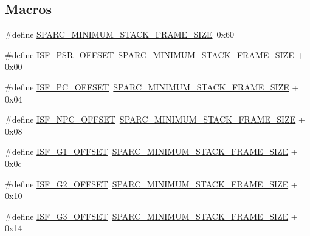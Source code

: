 \subsection*{Macros}
\begin{DoxyCompactItemize}
\item 
\#define \mbox{\hyperlink{group__RTEMSScoreCPUSPARC_ga8e296685f05588131b26bdc695cb9b8c}{S\+P\+A\+R\+C\+\_\+\+M\+I\+N\+I\+M\+U\+M\+\_\+\+S\+T\+A\+C\+K\+\_\+\+F\+R\+A\+M\+E\+\_\+\+S\+I\+ZE}}~0x60
\item 
\#define \mbox{\hyperlink{group__RTEMSScoreCPUSPARC_ga0bee4432eeecb5d6f29d6fbe5048382b}{I\+S\+F\+\_\+\+P\+S\+R\+\_\+\+O\+F\+F\+S\+ET}}~\mbox{\hyperlink{group__RTEMSScoreCPUSPARC_ga8e296685f05588131b26bdc695cb9b8c}{S\+P\+A\+R\+C\+\_\+\+M\+I\+N\+I\+M\+U\+M\+\_\+\+S\+T\+A\+C\+K\+\_\+\+F\+R\+A\+M\+E\+\_\+\+S\+I\+ZE}} + 0x00
\item 
\#define \mbox{\hyperlink{group__RTEMSScoreCPUSPARC_ga9a0a516f04675fb88825c67850a91df5}{I\+S\+F\+\_\+\+P\+C\+\_\+\+O\+F\+F\+S\+ET}}~\mbox{\hyperlink{group__RTEMSScoreCPUSPARC_ga8e296685f05588131b26bdc695cb9b8c}{S\+P\+A\+R\+C\+\_\+\+M\+I\+N\+I\+M\+U\+M\+\_\+\+S\+T\+A\+C\+K\+\_\+\+F\+R\+A\+M\+E\+\_\+\+S\+I\+ZE}} + 0x04
\item 
\#define \mbox{\hyperlink{group__RTEMSScoreCPUSPARC_gaa85e154baea37f924c40a562ceec4017}{I\+S\+F\+\_\+\+N\+P\+C\+\_\+\+O\+F\+F\+S\+ET}}~\mbox{\hyperlink{group__RTEMSScoreCPUSPARC_ga8e296685f05588131b26bdc695cb9b8c}{S\+P\+A\+R\+C\+\_\+\+M\+I\+N\+I\+M\+U\+M\+\_\+\+S\+T\+A\+C\+K\+\_\+\+F\+R\+A\+M\+E\+\_\+\+S\+I\+ZE}} + 0x08
\item 
\#define \mbox{\hyperlink{group__RTEMSScoreCPUSPARC_ga9c08c95ba5cb00d95e8e20edbae0d28a}{I\+S\+F\+\_\+\+G1\+\_\+\+O\+F\+F\+S\+ET}}~\mbox{\hyperlink{group__RTEMSScoreCPUSPARC_ga8e296685f05588131b26bdc695cb9b8c}{S\+P\+A\+R\+C\+\_\+\+M\+I\+N\+I\+M\+U\+M\+\_\+\+S\+T\+A\+C\+K\+\_\+\+F\+R\+A\+M\+E\+\_\+\+S\+I\+ZE}} + 0x0c
\item 
\#define \mbox{\hyperlink{group__RTEMSScoreCPUSPARC_gaa242fa752cee276259ccf1950425b2f2}{I\+S\+F\+\_\+\+G2\+\_\+\+O\+F\+F\+S\+ET}}~\mbox{\hyperlink{group__RTEMSScoreCPUSPARC_ga8e296685f05588131b26bdc695cb9b8c}{S\+P\+A\+R\+C\+\_\+\+M\+I\+N\+I\+M\+U\+M\+\_\+\+S\+T\+A\+C\+K\+\_\+\+F\+R\+A\+M\+E\+\_\+\+S\+I\+ZE}} + 0x10
\item 
\#define \mbox{\hyperlink{group__RTEMSScoreCPUSPARC_gaf7d7cbe720eb05ed947bd7c9964242b2}{I\+S\+F\+\_\+\+G3\+\_\+\+O\+F\+F\+S\+ET}}~\mbox{\hyperlink{group__RTEMSScoreCPUSPARC_ga8e296685f05588131b26bdc695cb9b8c}{S\+P\+A\+R\+C\+\_\+\+M\+I\+N\+I\+M\+U\+M\+\_\+\+S\+T\+A\+C\+K\+\_\+\+F\+R\+A\+M\+E\+\_\+\+S\+I\+ZE}} + 0x14

\end{DoxyCompactItemize}
